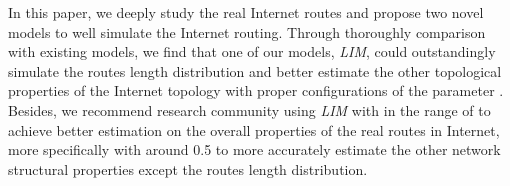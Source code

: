 \documentclass[a4paper]{llncs}
\begin{document}
In this paper, we deeply study the real Internet routes and propose two novel models to well simulate the
Internet routing. Through thoroughly comparison with existing models, we
find that one of our models, \textit{LIM}, could outstandingly
simulate the routes length distribution and better estimate the other
topological properties of the Internet topology with proper
configurations of the parameter . Besides, we recommend research
community using \textit{LIM} with  in the range of  to achieve better estimation on the
overall properties of the real routes in Internet, more specifically with  around 0.5 to more
accurately estimate the other network structural properties except the routes
length distribution.
\begin{comment}
What's more, through deeply
resurveying the sampling bias problem of traceroute-like methods by
considering \textit{LIM}, we conjecture that the corresponding
sampling bias is due to \textit{USPM} adopted previously. While,
the true traceroute in reality might be less biased, at least.
\end{comment}
\end{document}
